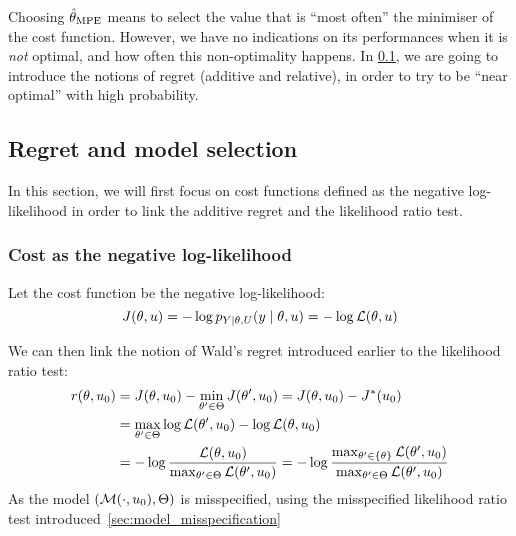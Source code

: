 \documentclass[../../Main_ManuscritThese.tex]{subfiles}
\begin{document}
Choosing $\hat{\theta}_{\mathrm{MPE}}$ means to select the value that is ``most often'' the minimiser of the cost function. However, we have no indications on its performances when it is \emph{not} optimal, and how often this non-optimality happens. 
In \cref{sec:regret}, we are going to introduce the notions of regret (additive and relative), in order to try to be ``near optimal'' with high probability.


\subsection{Regret and model selection}
\label{sec:regret}
In this section, we will first focus on cost functions defined as the negative log-likelihood in order to link the additive regret and the likelihood ratio test.
\subsubsection{Cost as the negative log-likelihood}

Let the cost function be the negative log-likelihood:
\begin{equation}
  J(\theta, u) = - \log p_{Y\mid \theta, U}(y \mid \theta, u) = -\log \mathcal{L}(\theta,u)
\end{equation}

We can then link the notion of Wald's regret introduced earlier to the likelihood ratio test:
  \begin{align}
    r(\theta,u_0) &= J(\theta, u_0) - \min_{\theta^{\prime}\in\Theta}J(\theta^{\prime}, u_0) = J(\theta,u_0) - J^*(u_0)  \\
                 &= \max_{\theta^{\prime}\in\Theta} \log \mathcal{L}(\theta^{\prime}, u_0) - \log \mathcal{L}(\theta, u_0) \\
                 &= -\log \frac{\mathcal{L}(\theta, u_0)}{\max_{\theta^{\prime}\in\Theta}\mathcal{L}(\theta^{\prime}, u_0)} = -\log \frac{\max_{\theta^{\prime}\in\{\theta\}}\mathcal{L}(\theta^{\prime}, u_0)}{\max_{\theta^{\prime}\in\Theta}\mathcal{L}(\theta^{\prime}, u_0)}
  \end{align}
As the model $(\mathcal{M}(\cdot, u_0), \Theta)$ is misspecified, using the misspecified likelihood ratio test introduced~\cref{sec:model_misspecification}
\end{document}
